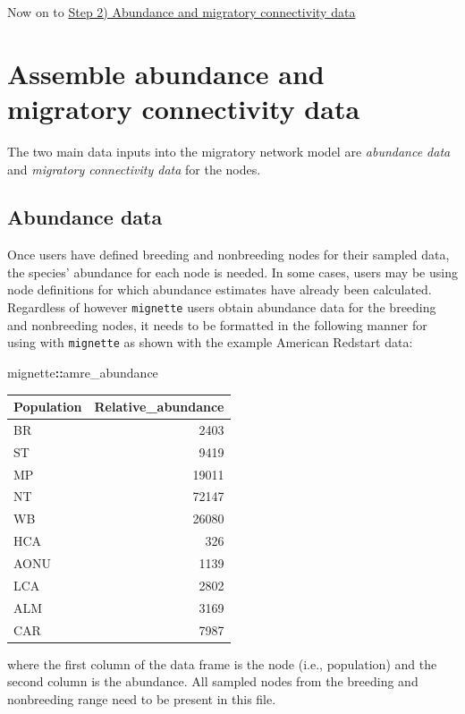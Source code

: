 \documentclass[
]{book}
\newenvironment{Shaded}{\begin{snugshade}}{\end{snugshade}}
\newcommand{\NormalTok}[1]{#1}
\newcommand{\SpecialCharTok}[1]{\textcolor[rgb]{0.81,0.36,0.00}{\textbf{#1}}}
\begin{document}
Now on to \protect\hyperlink{data}{Step 2) Abundance and migratory connectivity data}

\hypertarget{data}{%
\chapter{Assemble abundance and migratory connectivity data}\label{data}}

The two main data inputs into the migratory network model are \emph{abundance data} and \emph{migratory connectivity data} for the nodes.

\hypertarget{abundance-data}{%
\section{Abundance data}\label{abundance-data}}

Once users have defined breeding and nonbreeding nodes for their sampled data, the species' abundance for each node is needed. In some cases, users may be using node definitions for which abundance estimates have already been calculated. Regardless of however \texttt{mignette} users obtain abundance data for the breeding and nonbreeding nodes, it needs to be formatted in the following manner for using with \texttt{mignette} as shown with the example American Redstart data:

\begin{Shaded}
\begin{Highlighting}[]
\NormalTok{mignette}\SpecialCharTok{::}\NormalTok{amre\_abundance}
\end{Highlighting}
\end{Shaded}

\begin{tabular}{l|r}
\hline
Population & Relative\_abundance\\
\hline
BR & 2403\\
\hline
ST & 9419\\
\hline
MP & 19011\\
\hline
NT & 72147\\
\hline
WB & 26080\\
\hline
HCA & 326\\
\hline
AONU & 1139\\
\hline
LCA & 2802\\
\hline
ALM & 3169\\
\hline
CAR & 7987\\
\hline
\end{tabular}

where the first column of the data frame is the node (i.e., population) and the second column is the abundance. All sampled nodes from the breeding and nonbreeding range need to be present in this file.
\end{document}
